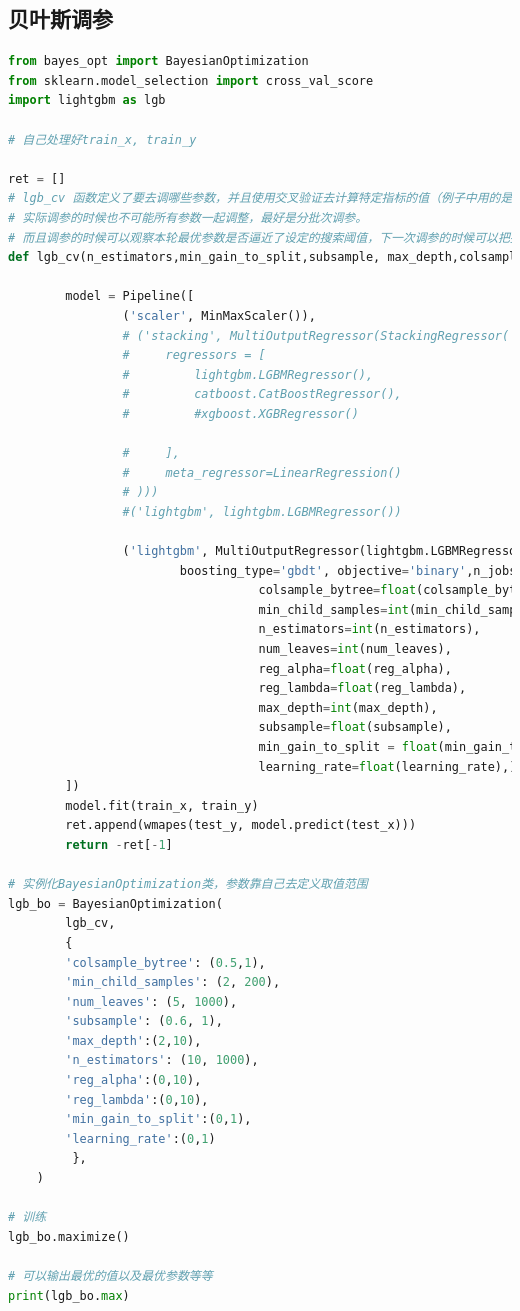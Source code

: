 \documentclass[withoutpreface,bwprint]{cumcmthesis}
\begin{document}
\subsection*{贝叶斯调参}
\begin{lstlisting}[language=python]
from bayes_opt import BayesianOptimization
from sklearn.model_selection import cross_val_score
import lightgbm as lgb

# 自己处理好train_x, train_y

ret = []
# lgb_cv 函数定义了要去调哪些参数，并且使用交叉验证去计算特定指标的值（例子中用的是roc_auc)。
# 实际调参的时候也不可能所有参数一起调整，最好是分批次调参。
# 而且调参的时候可以观察本轮最优参数是否逼近了设定的搜索阈值，下一次调参的时候可以把搜索的范围扩大。
def lgb_cv(n_estimators,min_gain_to_split,subsample, max_depth,colsample_bytree, min_child_samples,reg_alpha,reg_lambda,num_leaves,learning_rate):
 
        model = Pipeline([
                ('scaler', MinMaxScaler()),
                # ('stacking', MultiOutputRegressor(StackingRegressor(
                #     regressors = [
                #         lightgbm.LGBMRegressor(), 
                #         catboost.CatBoostRegressor(), 
                #         #xgboost.XGBRegressor()
                        
                #     ], 
                #     meta_regressor=LinearRegression()
                # )))
                #('lightgbm', lightgbm.LGBMRegressor())

                ('lightgbm', MultiOutputRegressor(lightgbm.LGBMRegressor(
                        boosting_type='gbdt', objective='binary',n_jobs=-1,
                                   colsample_bytree=float(colsample_bytree),
                                   min_child_samples=int(min_child_samples),
                                   n_estimators=int(n_estimators),
                                   num_leaves=int(num_leaves),
                                   reg_alpha=float(reg_alpha),
                                   reg_lambda=float(reg_lambda),
                                   max_depth=int(max_depth),
                                   subsample=float(subsample),
                                   min_gain_to_split = float(min_gain_to_split),
                                   learning_rate=float(learning_rate),)))
        ])
        model.fit(train_x, train_y)
        ret.append(wmapes(test_y, model.predict(test_x)))
        return -ret[-1]

# 实例化BayesianOptimization类，参数靠自己去定义取值范围
lgb_bo = BayesianOptimization(
        lgb_cv,
        {
        'colsample_bytree': (0.5,1),
        'min_child_samples': (2, 200),
        'num_leaves': (5, 1000),
        'subsample': (0.6, 1),
        'max_depth':(2,10),
        'n_estimators': (10, 1000),
        'reg_alpha':(0,10),
        'reg_lambda':(0,10),
        'min_gain_to_split':(0,1),
        'learning_rate':(0,1)
         },
    )

# 训练
lgb_bo.maximize()

# 可以输出最优的值以及最优参数等等
print(lgb_bo.max)
\end{lstlisting}
\end{document}
